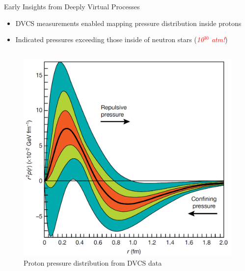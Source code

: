 \documentclass[aspectratio=169]{beamer}
\newcommand*{\myfont}{\fontfamily{lmtt}\selectfont}
\begin{document}
\begin{frame}{Early Insights from Deeply Virtual Processes}
\begin{itemize}
    \item DVCS measurements enabled mapping pressure distribution inside protons
    \item Indicated pressures exceeding those inside of neutron stars (\textcolor{red}{\textit{10$^{30}$ atm!}})
\end{itemize}

\begin{columns}

    \begin{minipage}[c][0.6\textheight][c]{\linewidth}
        \begin{figure}
            \centering
            \includegraphics[width=.56\textwidth]{defense/proton_pressure_dist.png}
            \caption{ \vspace{0.1cm}Proton pressure distribution from DVCS data\\
            {\myfont{\tiny [V.D. Burkert, L. Elouadrhiri, F.X. Girod, Nature 2018]}}}
        \end{figure}
    \end{minipage}



\end{columns}
\end{frame}
\end{document}
